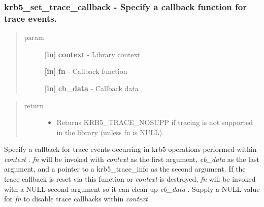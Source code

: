 \documentclass[letterpaper,10pt,english]{sphinxmanual}
\begin{document}
\subsubsection{krb5\_set\_trace\_callback -  Specify a callback function for trace events.}
\label{appdev/refs/api/krb5_set_trace_callback:krb5-set-trace-callback-specify-a-callback-function-for-trace-events}\label{appdev/refs/api/krb5_set_trace_callback::doc}

\begin{fulllineitems}
\label{appdev/refs/api/krb5_set_trace_callback:krb5_set_trace_callback}
\end{fulllineitems}

\begin{quote}\begin{description}
\item[{param}] \leavevmode
\textbf{{[}in{]}} \textbf{context} - Library context

\textbf{{[}in{]}} \textbf{fn} - Callback function

\textbf{{[}in{]}} \textbf{cb\_data} - Callback data

\end{description}\end{quote}
\begin{quote}\begin{description}
\item[{return}] \leavevmode\begin{itemize}
\item {} 
Returns KRB5\_TRACE\_NOSUPP if tracing is not supported in the library (unless fn is NULL).

\end{itemize}

\end{description}\end{quote}

Specify a callback for trace events occurring in krb5 operations performed within \emph{context} . \emph{fn} will be invoked with \emph{context} as the first argument, \emph{cb\_data} as the last argument, and a pointer to a krb5\_trace\_info as the second argument. If the trace callback is reset via this function or \emph{context} is destroyed, \emph{fn} will be invoked with a NULL second argument so it can clean up \emph{cb\_data} . Supply a NULL value for \emph{fn} to disable trace callbacks within \emph{context} .
\end{document}
